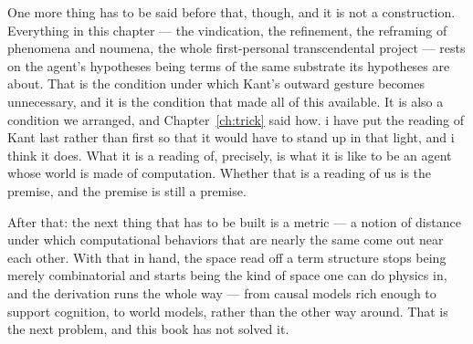 One more thing has to be said before that, though, and it is not a
construction.
Everything in this chapter --- the vindication, the refinement, the
reframing of phenomena and noumena, the whole first-personal
transcendental project --- rests on the agent's hypotheses being
terms of the same substrate its hypotheses are about.
That is the condition under which Kant's outward gesture becomes
unnecessary, and it is the condition that made all of this
available.
It is also a condition we arranged, and
Chapter~\ref{ch:trick} said how.
i have put the reading of Kant last rather than first so that it
would have to stand up in that light, and i think it does.
What it is a reading of, precisely, is what it is like to be an
agent whose world is made of computation.
Whether that is a reading of us is the premise, and the premise is
still a premise.

After that:
the next thing that has to be built is a metric --- a notion of
distance under which computational behaviors that are nearly the
same come out near each other.
With that in hand, the space read off a term structure stops being
merely combinatorial and starts being the kind of space one can do
physics in, and the derivation runs the whole way --- from causal
models rich enough to support cognition, to world models, rather
than the other way around.
That is the next problem, and this book has not solved it.
